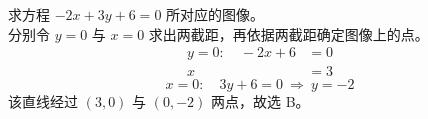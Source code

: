 \documentclass[12pt,a4paper]{exam-zh}
\begin{document}
\begin{solution}
    求方程 $-2x+3y+6=0$ 所对应的图像。 \\
    分别令 $y=0$ 与 $x=0$ 求出两截距，再依据两截距确定图像上的点。
    \begin{align*}
        y=0: \quad -2x+6 &= 0 \\
        x &= 3
    \end{align*}
    \[
        x=0: \quad 3y+6 = 0 \ \Rightarrow \ y = -2
    \]
    该直线经过 $(3,0)$ 与 $(0,-2)$ 两点，故选 B。
\end{solution}
\end{document}
